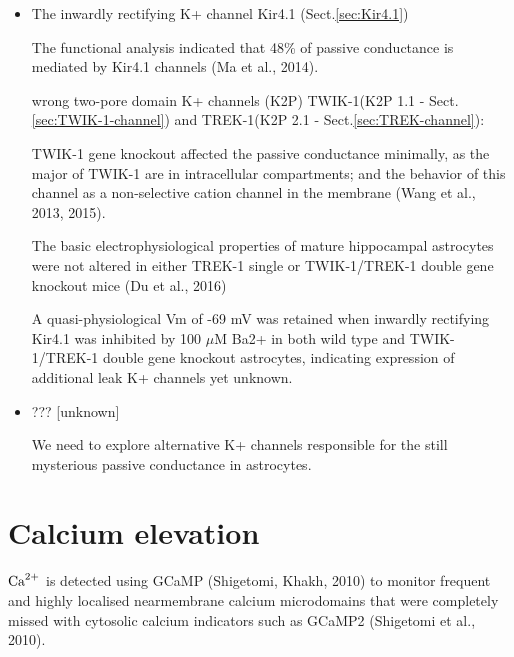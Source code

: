 \begin{itemize}
  \item  The inwardly rectifying K+ channel Kir4.1
(Sect.\ref{sec:Kir4.1}) 

The functional analysis indicated that 48\% of passive conductance
is mediated by Kir4.1 channels (Ma et al., 2014).

  \item [wrong] two-pore domain K+ channels (K2P) TWIK-1(K2P 1.1 -
Sect.\ref{sec:TWIK-1-channel}) and TREK-1(K2P 2.1 -
Sect.\ref{sec:TREK-channel}): 

TWIK-1 gene knockout affected the passive conductance minimally, as the major of
TWIK-1 are in intracellular compartments; and the behavior of this channel as a
non-selective cation channel in the membrane (Wang et al., 2013, 2015).

The basic electrophysiological properties of mature hippocampal astrocytes were
not altered in either TREK-1 single or TWIK-1/TREK-1 double gene knockout mice
(Du et al., 2016)

A quasi-physiological Vm of -69 mV was retained when inwardly rectifying Kir4.1
was inhibited by 100 $\mu$M Ba2+ in both wild type and TWIK-1/TREK-1 double gene
knockout astrocytes, indicating expression of additional leak K+ channels yet
unknown.

  \item ??? [unknown]
  
We need to explore alternative K+ channels responsible for the still
mysterious passive conductance in astrocytes.
\end{itemize}


\section{Calcium elevation}
\label{sec:astrocyte-calcium-elevation}

${\text{Ca}^{2+}}$ is detected using GCaMP (Shigetomi, Khakh, 2010) to monitor frequent and
highly localised nearmembrane calcium microdomains that were completely missed
with cytosolic calcium indicators such as GCaMP2 (Shigetomi et al., 2010).

